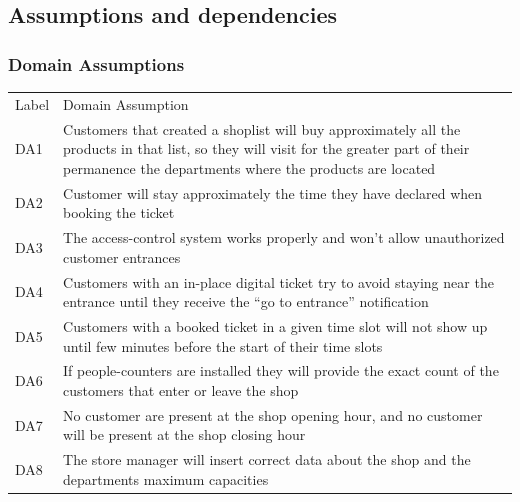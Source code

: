 \vfill

\subsection{Assumptions and dependencies}
\subsubsection{Domain Assumptions}

\renewcommand{\arraystretch}{1.4}
\begin{tabular}{C{1cm}L{14.1cm}}
    Label & Domain Assumption                                                                                                                                                                                  \\

    DA1   & Customers that created a shoplist will buy approximately all the products in that list, so they will visit for the greater part of their permanence the departments where the products are located \\

    DA2   & Customer will stay approximately the time they have declared when booking the ticket                                                                                                               \\

    DA3   & The access-control system works properly and won't allow unauthorized customer entrances                                                                                                           \\

    DA4   & Customers with an in-place digital ticket try to avoid staying near the entrance until they receive the ``go to entrance'' notification                                                            \\

    DA5   & Customers with a booked ticket in a given time slot will not show up until few minutes before the start of their time slots                                                                        \\

    DA6   & If people-counters are installed they will provide the exact count of the customers that enter or leave the shop                                                                                   \\

    DA7   & No customer are present at the shop opening hour, and no customer will be present at the shop closing hour                                                                                         \\

    DA8   & The store manager will insert correct data about the shop and the departments maximum capacities                                                                                                   \\
\end{tabular}

